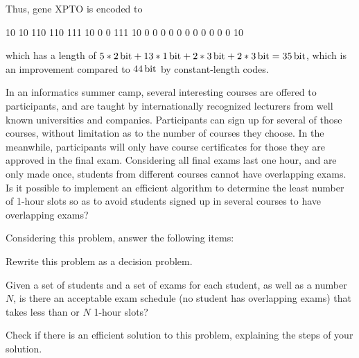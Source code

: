 {Thus, gene XPTO is encoded to

\begin{center}
    10 10 110 110 111 10 0 0 111 10 0 0 0 0 0 0 0 0 0 0 0 10
\end{center}

which has a length of $5*\SI{2}{\bit} + 13*\SI{1}{\bit} + 2*\SI{3}{\bit} + 2*\SI{3}{\bit} = \SI{35}{\bit}$, which is an improvement compared to $\SI{44}{\bit}$ by constant-length codes.

In an informatics summer camp, several interesting courses are offered to participants, and are taught by internationally recognized lecturers from well known universities and companies. Participants can sign up for several of those courses, without limitation as to the number of courses they choose. In the meanwhile, participants will only have course certificates for those they are approved in the final exam. Considering all final exams last one hour, and are only made once, students from different courses cannot have overlapping exams. Is it possible to implement an efficient algorithm to determine the least number of 1-hour slots so as to avoid students signed up in several courses to have overlapping exams?

Considering this problem, answer the following items:

Rewrite this problem as a decision problem.

\ansseparator

Given a set of students and a set of exams for each student, as well as a number $N$, is there an acceptable exam schedule (no student has overlapping exams) that takes less than or $N$ 1-hour slots?

Check if there is an efficient solution to this problem, explaining the steps of your solution.

\ansseparator

}
